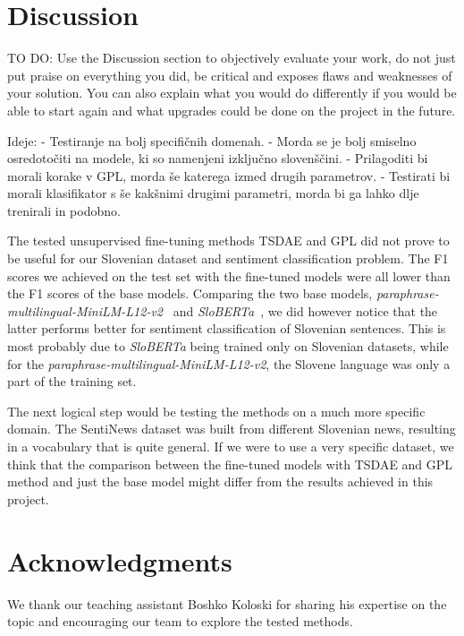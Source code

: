 \documentclass[fleqn,moreauthors,10pt]{ds_report}
\begin{document}



\section*{Discussion}

TO DO:
Use the Discussion section to objectively evaluate your work, do not just put praise on everything you did, be critical and exposes flaws and weaknesses of your solution. You can also explain what you would do differently if you would be able to start again and what upgrades could be done on the project in the future.

Ideje:
- Testiranje na bolj specifičnih domenah.
- Morda se je bolj smiselno osredotočiti na modele, ki so namenjeni izključno slovenščini.
- Prilagoditi bi morali korake v GPL, morda še katerega izmed drugih parametrov.
- Testirati bi morali klasifikator s še kakšnimi drugimi parametri, morda bi ga lahko dlje trenirali in podobno.


The tested unsupervised fine-tuning methods TSDAE and GPL did not prove to be useful for our Slovenian dataset and sentiment classification problem. The F1 scores we achieved on the test set with the fine-tuned models were all lower than the F1 scores of the base models. Comparing the two base models, {\it paraphrase-multilingual-MiniLM-L12-v2}~\cite{reimers-2019-sentence-bert} and {\it SloBERTa}~\cite{sloberta}, we did however notice that the latter performs better for sentiment classification of Slovenian sentences. This is most probably due to {\it SloBERTa} being trained only on Slovenian datasets, while for the {\it paraphrase-multilingual-MiniLM-L12-v2}, the Slovene language was only a part of the training set.

The next logical step would be testing the methods on a much more specific domain. The SentiNews dataset was built from different Slovenian news, resulting in a vocabulary that is quite general. If we were to use a very specific dataset, we think that the comparison between the fine-tuned models with TSDAE and GPL method and just the base model might differ from the results achieved in this project.






\section*{Acknowledgments}

We thank our teaching assistant Boshko Koloski for sharing his expertise on the topic and encouraging our team to explore the tested methods.




\end{document}
